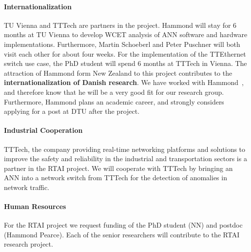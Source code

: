 \documentclass[fleqn,12pt]{article}
\begin{document}

\paragraph*{Internationalization}

TU Vienna and TTTech are partners in the project. %
Hammond will stay for 6 months
at TU Vienna to develop WCET analysis of ANN software and hardware
implementations. Furthermore, Martin Schoeberl and Peter Puschner will both visit each other
for about four weeks.
For the implementation of the TTEthernet switch use case, the PhD student will spend
6 months at TTTech in Vienna.
%
The attraction of Hammond form New Zealand to this project contributes to the {\bf internationalization
of Danish research}. We have worked with Hammond~\cite{FasterFunctionBlocks}, and therefore
know that he will be a very good fit for our research group.
Furthermore, Hammond plans an academic career, and strongly considers applying
for a post at DTU after the project.

\paragraph*{Industrial Cooperation}

TTTech, the company providing real-time networking platforms and solutions to improve
the safety and reliability in the industrial and transportation sectors is a partner in the RTAI
project. We will cooperate with TTTech by bringing an ANN into a network switch from TTTech
for the detection of anomalies in network traffic.


\paragraph*{Human Resources}

For the RTAI project we
request funding of the PhD student (NN) and postdoc (Hammond Pearce).
Each of the senior researchers will contribute to the RTAI research project.
\end{document}
